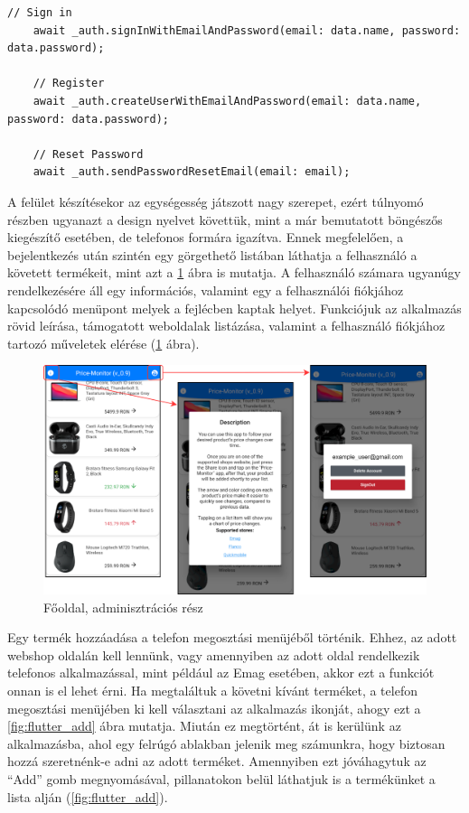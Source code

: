 \begin{lstlisting}[caption={Bejelentkező/regisztráló/jelszó csere funkciót megvalósító függvények}, label={lst:flutter_login_functions}, basicstyle=\footnotesize]
    // Sign in
    await _auth.signInWithEmailAndPassword(email: data.name, password: data.password);
    
    // Register
    await _auth.createUserWithEmailAndPassword(email: data.name, password: data.password);
    
    // Reset Password
    await _auth.sendPasswordResetEmail(email: email);
\end{lstlisting}

A felület készítésekor az egységesség játszott nagy szerepet, ezért túlnyomó részben ugyanazt a design nyelvet követtük, mint a már bemutatott böngészős kiegészítő esetében, de telefonos formára igazítva. Ennek megfelelően, a bejelentkezés után szintén egy görgethető listában láthatja a felhasználó a követett termékeit, mint azt a \ref{fig:flutter_home_info_user} ábra is mutatja. A felhasználó számara ugyanúgy rendelkezésére áll egy információs, valamint egy a felhasználói fiókjához kapcsolódó menüpont melyek a fejlécben kaptak helyet. Funkciójuk az alkalmazás rövid leírása, támogatott weboldalak listázása, valamint a felhasználó fiókjához tartozó műveletek elérése (\ref{fig:flutter_home_info_user} ábra).

\begin{figure}[H]
    \centering
    \includegraphics[scale=1]{figures/images/flutter_home_info_user.png}
    \caption{Főoldal, adminisztrációs rész}
    \label{fig:flutter_home_info_user}
\end{figure}

Egy termék hozzáadása a telefon megosztási menüjéből történik. Ehhez, az adott webshop oldalán kell lennünk, vagy amennyiben az adott oldal rendelkezik telefonos alkalmazással, mint például az Emag esetében, akkor ezt a funkciót onnan is el lehet érni. Ha megtaláltuk a követni kívánt terméket, a telefon megosztási menüjében ki kell választani az alkalmazás ikonját, ahogy ezt a \ref{fig:flutter_add} ábra mutatja. Miután ez megtörtént, át is kerülünk az alkalmazásba, ahol egy felrúgó ablakban jelenik meg számunkra, hogy biztosan hozzá szeretnénk-e adni az adott terméket. Amennyiben ezt jóváhagytuk az “Add” gomb megnyomásával, pillanatokon belül láthatjuk is a termékünket a lista alján (\ref{fig:flutter_add}).

